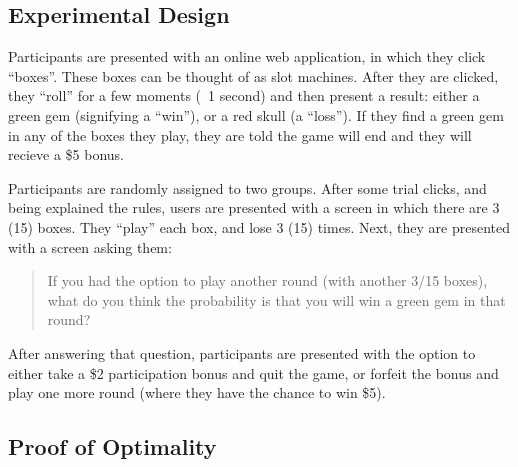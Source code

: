 \documentclass[a4paper,12pt]{article}
\begin{document}
\subsection{ Experimental Design }

Participants are presented with an online web application, in which they click ``boxes''. These boxes can be thought of as slot machines. After they are clicked, they ``roll'' for a few moments (~1 second) and then present a result: either a green gem (signifying a ``win''), or a red skull (a ``loss''). If they find a green gem in any of the boxes they play, they are told the game will end and they will recieve a \$5 bonus.

Participants are randomly assigned to two groups. After some trial clicks, and being explained the rules, users are presented with a screen in which there are 3 (15) boxes. They ``play'' each box, and lose 3 (15) times. Next, they are presented with a screen asking them:

\begin{quote}
If you had the option to play another round (with another 3/15 boxes), what do you think the probability is that you will win a green gem in that round?
\end{quote}

After answering that question, participants are presented with the option to either take a \$2 participation bonus and quit the game, or forfeit the bonus and play one more round (where they have the chance to win \$5).

\subsection{ Proof of Optimality }
\end{document}
